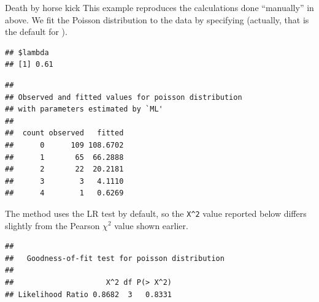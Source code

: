 \documentclass[11pt]{book}
\renewenvironment{knitrout}{\small\renewcommand{\baselinestretch}{.85}}{} %
\begin{document}
\begin{Example}[HKfit]{Death by horse kick}
This example reproduces the calculations done ``manually''
in  above. We fit the Poisson distribution to
the  data by specifying 
(actually, that is the default for ).
\begin{knitrout}
\color{fgcolor}\begin{kframe}
\begin{alltt}
\hlstd{(}\hlstd{,} \hlstd{=}\hlstd{)}
 \hlkwb{<-}  \hlstd{=}\hlstd{)}
\hlopt{$}
\end{alltt}
\begin{verbatim}
## $lambda
## [1] 0.61
\end{verbatim}
\begin{alltt}
\end{alltt}
\begin{verbatim}
## 
## Observed and fitted values for poisson distribution
## with parameters estimated by `ML' 
## 
##  count observed   fitted
##      0      109 108.6702
##      1       65  66.2888
##      2       22  20.2181
##      3        3   4.1110
##      4        1   0.6269
\end{verbatim}
\end{kframe}
\end{knitrout}
The  method uses the LR test by default, so the \verb|X^2|
value reported below differs slightly from the Pearson $\chi^2$ value shown
earlier.
\begin{knitrout}
\color{fgcolor}\begin{kframe}
\begin{alltt}
\end{alltt}
\begin{verbatim}
## 
## 	 Goodness-of-fit test for poisson distribution
## 
##                     X^2 df P(> X^2)
## Likelihood Ratio 0.8682  3   0.8331
\end{verbatim}
\end{kframe}
\end{knitrout}
\end{Example}
\end{document}
